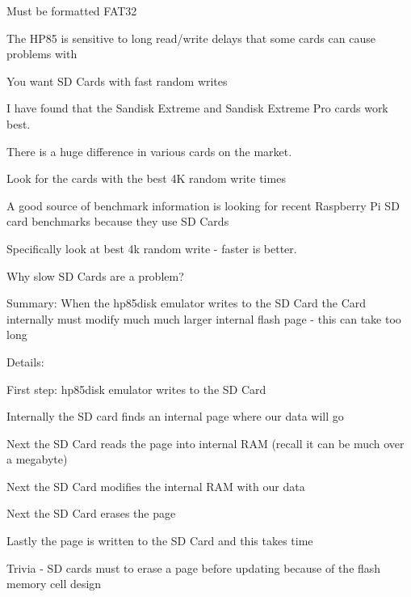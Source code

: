 \begin{DoxyItemize}
\item Must be formatted F\+A\+T32
\item The H\+P85 is sensitive to long read/write delays that some cards can cause problems with
\begin{DoxyItemize}
\item You want SD Cards with fast random writes
\item I have found that the Sandisk Extreme and Sandisk Extreme Pro cards work best.
\begin{DoxyItemize}
\item There is a huge difference in various cards on the market.
\item Look for the cards with the best 4K random write times
\item A good source of benchmark information is looking for recent Raspberry Pi SD card benchmarks because they use SD Cards
\begin{DoxyItemize}
\item Specifically look at best 4k random write -\/ faster is better.
\end{DoxyItemize}
\end{DoxyItemize}
\item Why slow SD Cards are a problem?
\begin{DoxyItemize}
\item Summary\+: When the hp85disk emulator writes to the SD Card the Card internally must modify much much larger internal flash page -\/ this can take too long
\item Details\+:
\begin{DoxyItemize}
\item First step\+: hp85disk emulator writes to the SD Card
\item Internally the SD card finds an internal page where our data will go
\item Next the SD Card reads the page into internal R\+AM (recall it can be much over a megabyte)
\item Next the SD Card modifies the internal R\+AM with our data
\item Next the SD Card erases the page
\item Lastly the page is written to the SD Card and this takes time
\begin{DoxyItemize}
\item Trivia -\/ SD cards must to erase a page before updating because of the flash memory cell design
\end{DoxyItemize}

\end{DoxyItemize}
\end{DoxyItemize}
\end{DoxyItemize}
\end{DoxyItemize}
